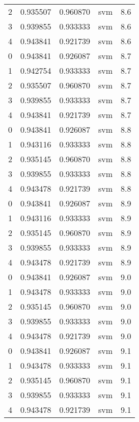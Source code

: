 \begin{tabular}{rrrlr}
     2 & 0.935507 & 0.960870 &      svm &        8.6 \\
     3 & 0.939855 & 0.933333 &      svm &        8.6 \\
     4 & 0.943841 & 0.921739 &      svm &        8.6 \\
     0 & 0.943841 & 0.926087 &      svm &        8.7 \\
     1 & 0.942754 & 0.933333 &      svm &        8.7 \\
     2 & 0.935507 & 0.960870 &      svm &        8.7 \\
     3 & 0.939855 & 0.933333 &      svm &        8.7 \\
     4 & 0.943841 & 0.921739 &      svm &        8.7 \\
     0 & 0.943841 & 0.926087 &      svm &        8.8 \\
     1 & 0.943116 & 0.933333 &      svm &        8.8 \\
     2 & 0.935145 & 0.960870 &      svm &        8.8 \\
     3 & 0.939855 & 0.933333 &      svm &        8.8 \\
     4 & 0.943478 & 0.921739 &      svm &        8.8 \\
     0 & 0.943841 & 0.926087 &      svm &        8.9 \\
     1 & 0.943116 & 0.933333 &      svm &        8.9 \\
     2 & 0.935145 & 0.960870 &      svm &        8.9 \\
     3 & 0.939855 & 0.933333 &      svm &        8.9 \\
     4 & 0.943478 & 0.921739 &      svm &        8.9 \\
     0 & 0.943841 & 0.926087 &      svm &        9.0 \\
     1 & 0.943478 & 0.933333 &      svm &        9.0 \\
     2 & 0.935145 & 0.960870 &      svm &        9.0 \\
     3 & 0.939855 & 0.933333 &      svm &        9.0 \\
     4 & 0.943478 & 0.921739 &      svm &        9.0 \\
     0 & 0.943841 & 0.926087 &      svm &        9.1 \\
     1 & 0.943478 & 0.933333 &      svm &        9.1 \\
     2 & 0.935145 & 0.960870 &      svm &        9.1 \\
     3 & 0.939855 & 0.933333 &      svm &        9.1 \\
     4 & 0.943478 & 0.921739 &      svm &        9.1 \\

\end{tabular}
